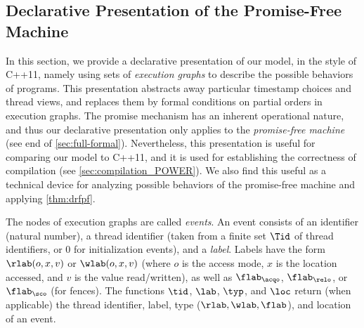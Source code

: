 \subsection{Declarative Presentation of the Promise-Free Machine}
\label{sec:axiomatic}

In this section, we provide a declarative presentation of our model, 
in the style of C++11, namely using sets of \emph{execution graphs} to describe the possible behaviors of programs.
This presentation abstracts away particular timestamp choices and thread views, 
and replaces them by formal conditions on partial orders in execution graphs.
The promise mechanism has an inherent operational nature, 
and thus our declarative presentation only applies to
the \emph{promise-free machine} (see end of \cref{sec:full-formal}).
Nevertheless, this presentation is useful for comparing our model to C++11, 
and it is used for establishing the correctness of compilation (see \cref{sec:compilation_POWER}). 
We also find this useful as a technical device for analyzing
possible behaviors of the promise-free machine and applying \cref{thm:drfpf}.

The nodes of execution graphs are called \emph{events}.
%
An {event} consists of
an identifier (natural number), 
a thread identifier (taken from a finite set $\Tid$ of thread identifiers,
or $0$ for initialization events), 
and a \emph{label}.
Labels have the form
${\rlab}(o,x,v)$ or ${\wlab}(o,x,v)$ 
(where $o$ is the access mode, 
$x$ is the location accessed, and
$v$ is the value read/written),
as well as $\flab_\acqo$, $\flab_\relo$, or $\flab_\sco$
(for fences).
The functions $\tid$, $\lab$, $\typ$, and $\loc$
return (when applicable) the thread identifier, 
label, type ($\rlab,\wlab,\flab$), and location of an event.

